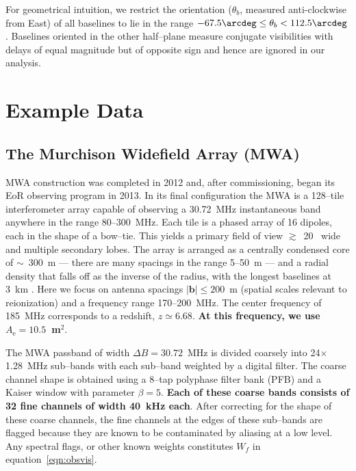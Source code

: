 \documentclass[preprint2,iop,numberedappendix]{emulateapj}
\begin{document}
For geometrical intuition, we restrict the orientation ($\theta_b$, measured anti-clockwise from East) of all baselines to lie in the range $-67.5\arcdeg \leq \theta_b < 112.5\arcdeg$. Baselines oriented in the other half--plane measure conjugate visibilities with delays of equal magnitude but of opposite sign and hence are ignored in our analysis.

\section{Example Data}\label{sec:instrument}

\subsection{The Murchison Widefield Array (MWA)}

MWA construction was completed in 2012 and, after commissioning, began its EoR observing program in 2013. In its final configuration the MWA is a 128--tile interferometer array capable of observing a 30.72~MHz instantaneous band anywhere in the range 80--300~MHz. Each tile is a phased array of 16 dipoles, each in the shape of a bow--tie. This yields a primary field of view $\gtrsim$~20\arcdeg~ wide and multiple secondary lobes. The array is arranged as a centrally condensed core of $\sim$~300~m --- there are many spacings in the range 5--50~m --- and a radial density that falls off as the inverse of the radius, with the longest baselines at 3~km \citep{bea12}. Here we focus on antenna spacings $|\boldsymbol{b}| \le 200$~m (spatial scales relevant to reionization) and a frequency range 170--200~MHz. The center frequency of 185~MHz corresponds to a redshift, $z\simeq 6.68$. {\bf At this frequency, we use $A_\textrm{e}=10.5$~m$^2$}.

The MWA passband of width $\Delta B=30.72$~MHz is divided coarsely into 24$\times$1.28~MHz sub--bands with each sub--band weighted by a digital filter. The coarse channel shape is obtained using a 8--tap polyphase filter bank (PFB) and a Kaiser window with parameter $\beta=5$. {\bf Each of these coarse bands consists of 32 fine channels of width 40~kHz each}. After correcting for the shape of these coarse channels, the fine channels at the edges of these sub--bands are flagged because they are known to be contaminated by aliasing at a low level. Any spectral flags, or other known weights constitutes $W_f$ in equation~\ref{eqn:obsvis}. 

\end{document}
